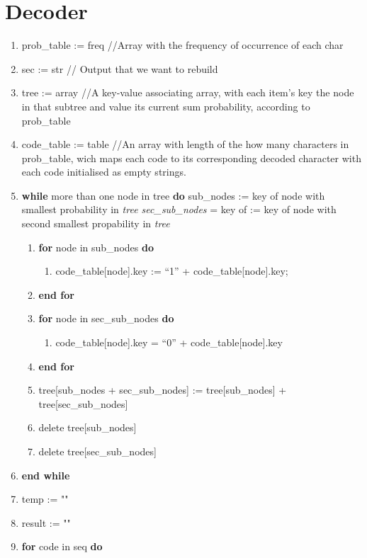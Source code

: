 \section{Decoder}
\begin{enumerate}
\tightlist
\item
  prob\_table := freq //Array with the frequency of occurrence of each
  char
\item
  sec := str // Output that we want to rebuild
\item
  tree := array //A key-value associating array, with each item's key
  the node in that subtree and value its current sum probability,
  according to prob\_table
\item
  code\_table := table //An array with length of the how many characters
  in prob\_table, wich maps each code to its corresponding decoded
  character with each code initialised as empty strings.
\item
  \textbf{while} more than one node in tree \textbf{do} sub\_nodes :=
  key of node with smallest probability in \emph{tree sec\_sub\_nodes} =
  key of := key of node with second smallest propability in \emph{tree}

  \begin{enumerate}
  \def\labelenumii{\arabic{enumii}.}
  \setcounter{enumii}{5}
  \tightlist
  \item
    \textbf{for} node in sub\_nodes \textbf{do}
    \begin{enumerate}
    \def\labelenumiii{\arabic{enumiii}.}
    \setcounter{enumiii}{6}
    \tightlist
    \item
      code\_table{[}node{]}.key := ``1'' + code\_table{[}node{]}.key;
    \end{enumerate}
  \item
    \textbf{end for}
  \item
    \textbf{for} node in sec\_sub\_nodes \textbf{do}

    \begin{enumerate}
    \def\labelenumiii{\arabic{enumiii}.}
    \setcounter{enumiii}{9}
    \tightlist
    \item
      code\_table{[}node{]}.key = ``0'' + code\_table{[}node{]}.key
    \end{enumerate}
  \item
    \textbf{end for}
  \item
    tree{[}sub\_nodes + sec\_sub\_nodes{]} := tree{[}sub\_nodes{]} +
    tree{[}sec\_sub\_nodes{]}
  \item
    delete tree{[}sub\_nodes{]}
  \item
    delete tree{[}sec\_sub\_nodes{]}
  \end{enumerate}
\item
  \textbf{end while}
\item
  temp := ""
\item
  result := ""
\item
  \textbf{for} code in seq \textbf{do}


\end{enumerate}
